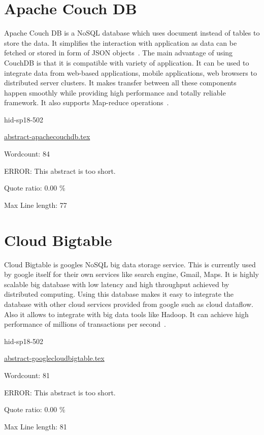 \section{Apache Couch DB}

Apache Couch DB is a NoSQL database which uses document instead of tables to
store the data. It simplifies the interaction with application as data can be
fetched or stored in form of JSON objects~\cite{hid-sp18-502-ApacheCouchDB}.
The main advantage of using CouchDB is that it is compatible with variety of
application. It can be used to integrate data from web-based applications,
mobile applications, web browsers to distributed server clusters. It makes
transfer between all these components happen smoothly while providing high
performance and totally reliable framework. It also supports Map-reduce
operations~\cite{hid-sp18-502-ApacheCouchDB}.


\begin{IU}

hid-sp18-502

\href{https://github.com/cloudmesh-community/hid-sp18-502/blob/master//technology/abstract-apachecouchdb.tex}{abstract-apachecouchdb.tex}

 

Wordcount: 84

ERROR: This abstract is too short.


Quote ratio: 0.00 \%
 
Max Line length: 77
\end{IU}

\section{Cloud Bigtable}

Cloud Bigtable is googles NoSQL big data storage service. This is currently
used by google itself for their own services like search engine, Gmail, Maps.
It is highly scalable big database with low latency and high throughput achieved
by distributed computing. Using this database makes it easy to integrate the
database with other cloud services provided from google such as cloud dataflow.
Also it allows to integrate with big data tools like Hadoop. It can achieve high 
performance of millions of transactions per  
second~\cite{hid-sp18-502-GoogleCloudBigtable}.





\begin{IU}

hid-sp18-502

\href{https://github.com/cloudmesh-community/hid-sp18-502/blob/master//technology/abstract-googlecloudbigtable.tex}{abstract-googlecloudbigtable.tex}

 

Wordcount: 81

ERROR: This abstract is too short.


Quote ratio: 0.00 \%
 
Max Line length: 81
\end{IU}


